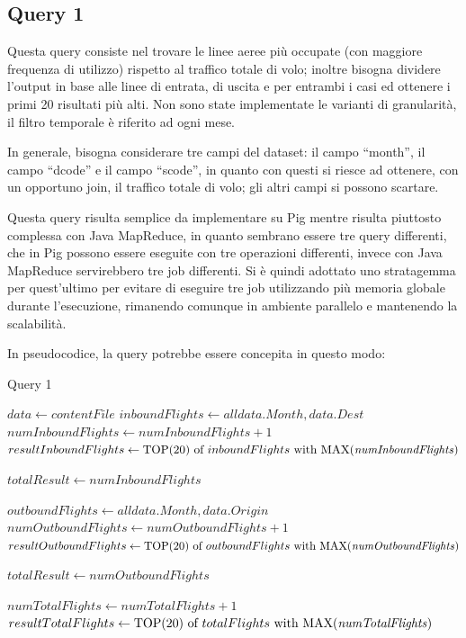 \documentclass[11pt]{article} %
\begin{document}
\subsection{Query 1}

Questa query consiste nel trovare le linee aeree più occupate (con maggiore frequenza di utilizzo) rispetto al traffico totale di volo; inoltre bisogna dividere l'output in base alle linee di entrata, di uscita e per entrambi i casi ed ottenere i primi 20 risultati più alti. Non sono state implementate le varianti di granularità, il filtro temporale è riferito ad ogni mese.

In generale, bisogna considerare tre campi del dataset: il campo ``month'', il campo ``dcode'' e il campo ``scode'', in quanto con questi si riesce ad ottenere, con un opportuno join, il traffico totale di volo; gli altri campi si possono scartare.

Questa query risulta semplice da implementare su Pig mentre risulta piuttosto complessa con Java MapReduce, in quanto sembrano essere tre query differenti, che in Pig possono essere eseguite con tre operazioni differenti, invece con Java MapReduce servirebbero tre job differenti. Si è quindi adottato uno stratagemma per quest'ultimo per evitare di eseguire tre job utilizzando più memoria globale durante l'esecuzione, rimanendo comunque in ambiente parallelo e mantenendo la scalabilità.

In pseudocodice, la query potrebbe essere concepita in questo modo:

\begin{algorithm}
\caption{Query 1}\label{euclid}
\begin{algorithmic}[0]
\State $data \gets contentFile$
\State $inboundFlights \gets all data.Month, data.Dest$
\State $numInboundFlights \gets numInboundFlights+1$
\EndFor
\State $resultInboundFlights \gets \text{TOP(20) of }inboundFlights \text{ with MAX(\textit{numInboundFlights})}$

\State $totalResult \gets numInboundFlights$

\State $outboundFlights \gets all data.Month, data.Origin$
\State $numOutboundFlights \gets numOutboundFlights+1$
\EndFor
\State $resultOutboundFlights \gets \text{TOP(20) of }outboundFlights \text{ with MAX(\textit{numOutboundFlights})}$

\State $totalResult \gets numOutboundFlights$

\State $numTotalFlights \gets numTotalFlights+1$
\EndFor
\State $resultTotalFlights \gets \text{TOP(20) of }totalFlights \text{ with MAX(\textit{numTotalFlights})}$

\end{algorithmic}
\end{algorithm}
\end{document}
